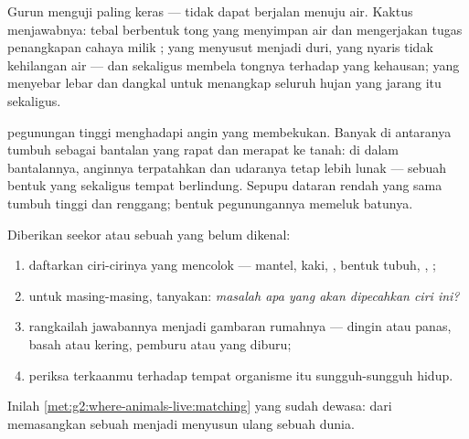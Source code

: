 \begin{example}[Kaktus]\label{ex:g4:adapted-to-their-world:cactus}
Gurun menguji  paling keras ---  tidak dapat berjalan
menuju air. Kaktus menjawabnya:  tebal berbentuk tong yang
menyimpan air dan mengerjakan tugas penangkapan cahaya milik ;
 yang menyusut menjadi duri, yang nyaris tidak kehilangan air ---
dan sekaligus membela tongnya terhadap  yang kehausan;  yang
menyebar lebar dan dangkal untuk menangkap seluruh hujan yang jarang
itu sekaligus.
\end{example}

\begin{example}\label{ex:g4:adapted-to-their-world:alpine}
 pegunungan tinggi menghadapi angin yang membekukan. Banyak di
antaranya tumbuh sebagai bantalan yang rapat dan merapat ke tanah: di
dalam bantalannya, anginnya terpatahkan dan udaranya tetap lebih
lunak --- sebuah bentuk yang sekaligus tempat berlindung. Sepupu dataran
rendah  yang sama tumbuh tinggi dan renggang; bentuk
pegunungannya memeluk batunya.
\end{example}

\begin{method}\label{met:g4:adapted-to-their-world:read}
Diberikan seekor  atau sebuah  yang belum dikenal:
\begin{enumerate}
  \item daftarkan ciri-cirinya yang mencolok --- mantel, kaki, ,
        bentuk tubuh, , ;
  \item untuk masing-masing, tanyakan: \emph{masalah apa yang akan
        dipecahkan ciri ini?}
  \item rangkailah jawabannya menjadi gambaran rumahnya --- dingin
        atau panas, basah atau kering, pemburu atau yang diburu;
  \item periksa terkaanmu terhadap tempat organisme itu sungguh-sungguh
        hidup.
\end{enumerate}
Inilah \cref{met:g2:where-animals-live:matching} yang sudah dewasa:
dari memasangkan sebuah  menjadi menyusun ulang sebuah dunia.
\end{method}

